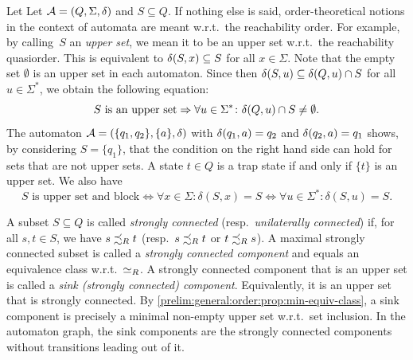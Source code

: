 
Let Let $\mathcal A = (Q, \Sigma, \delta)$ and $S \subseteq Q$. If nothing else is said, 
order-theoretical notions in the context of automata
are meant w.r.t.~the reachability order. For example,
by calling~$S$ an \emph{upper set}, we mean 
it to be an upper set w.r.t.~the reachability quasiorder. This is equivalent
to $\delta(S,x) \subseteq S$ for all $x \in \Sigma$. Note that the empty set $\emptyset$
is an upper set in each automaton.
Since then $\delta(S,u) \subseteq \delta(Q,u) \cap S$ for all
$u \in \Sigma^*$, we obtain
the following equation:
\begin{equation} 
	\text{$S$ is an upper set} \Rightarrow \forall u \in \Sigma^* \colon \delta(Q,u) \cap S \ne \emptyset. \label{sync_max:eqn:upper_set} 
\end{equation}
The automaton $\mathcal A = (\{q_1,q_2\}, \{a\}, \delta)$
with $\delta(q_1,a) = q_2$
and $\delta(q_2,a) = q_1$ 
shows, by considering $S = \{q_1\}$,
that the condition on the right hand side can hold 
for sets that are not upper sets. A state $t \in Q$
is a trap state if and only if $\{t\}$ is an upper set.
We also have
\begin{equation}\label{eqn:closed-block}
	\text{$S$ is upper set and block} \Leftrightarrow  \forall x \in \Sigma \colon \delta(S, x) = S \Leftrightarrow \forall u \in \Sigma^* \colon \delta(S, u) = S.
\end{equation}

A subset $S \subseteq Q$ is called \emph{strongly connected} (resp.~\emph{unilaterally connected}) 
if, for all $s, t \in S$, we have $s \precsim_R t$
(resp.~$s \precsim_R t$
or $t \precsim_R s$). 
A maximal strongly connected subset is called a \emph{strongly connected component}
and equals an equivalence class w.r.t.~$\simeq_R$.
A strongly connected component that is an upper set is called a \emph{sink (strongly connected) component}. Equivalently,
it is an upper set that is strongly connected.
By \cref{prelim:general:order:prop:min-equiv-class}, 
a sink component is precisely a minimal non-empty upper set w.r.t.~set inclusion.
In the automaton graph, the sink components are the strongly connected components
without transitions leading out of it.

